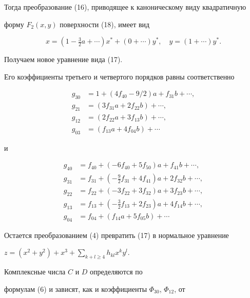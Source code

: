 Тогда преобразование (16), приводящее к каноническому виду квадратичную


форму $ F_2 (x,y) $ поверхности (18), имеет вид


$$


x=(1 - \tfrac32 a+\dotsb) x^*+(0+\dotsb) y^*,\quad


y=(1+\dotsb) y^* .


$$


Получаем новое уравнение вида (17).


Его коэффициенты третьего и четвертого порядков равны соответственно


\begin{align*}


g_{30}&= 1+(4 f_{40} - 9/2) a+f_{31} b+\dotsb, \\


g_{21}&= (3 f_{31} a+2 f_{22} b)+\dotsb, \\


g_{12}&= (2 f_{22} a+3 f_{13} b)+\dotsb, \\


g_{03}&= (f_{13} a+4 f_{04} b)+\dotsb 


\end{align*}


и


\begin{align*}


g_{40}&= f_{40}+(- 6 f_{40}+5 f_{50}) a+f_{41} b+\dotsb, \\


g_{31}&= f_{31}+(- \tfrac92 f_{31}+4 f_{41}) a+2 f_{32} b+\dotsb, \\


g_{22}&= f_{22}+(- 3 f_{22}+3 f_{32}) a+3 f_{23} b+\dotsb, \\


g_{13}&= f_{13}+(- \tfrac32 f_{13}+2 f_{23}) a+4 f_{14} b+\dotsb, \\


g_{04}&= f_{04}+(f_{14} a+5 f_{05} b)+\dotsb


\end{align*}


Остается преобразованием (4) превратить (17) в нормальное уравнение


$z=(x^2+y^2)+x^3+\sum\limits_{k+l \ge 4} h_{kl} x^ky^l$.





Комплексные числа $C$ и $D$ определяются по


формулам (6) и зависят, как и коэффициенты $\Phi_{30}$, $\Phi_{12}$, от


